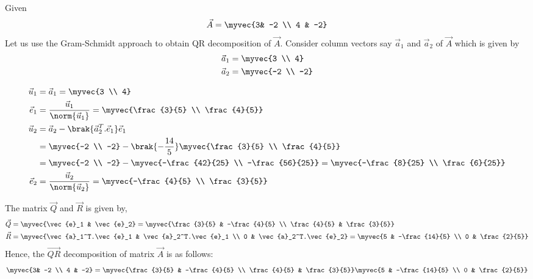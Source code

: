 
Given
\begin{align}
	\vec{A} =\myvec{3& -2 \\ 4 & -2}
\end{align}
Let us use the Gram-Schmidt approach to obtain QR decomposition of $\vec{A}$. Consider column vectors say $\vec{a}_1$ and $\vec{a}_2$ of $\vec{A}$ which is given by
\begin{align}
	\vec{a}_1 &=\myvec{3 \\ 4} \\
	\vec{a}_2 &=\myvec{-2 \\ -2}
\end{align}

\begin{align}
\vec{u}_1 &= \vec{a}_1 = \myvec{3 \\ 4} \\
\vec{e}_1 &= \frac{\vec{u}_1}{\norm{\vec{u}_1}} = \myvec{\frac{3}{5} \\ \frac{4}{5}}\\
\vec{u}_2 &= \vec{a}_2 - \brak{\vec{a}_2^T.\vec{e}_1}\vec{e}_1\\ 
&= \myvec{-2 \\ -2} - \brak{-\frac{14}{5}}\myvec{\frac{3}{5} \\ \frac{4}{5}}\\
&= \myvec{-2 \\ -2} - \myvec{-\frac{42}{25} \\ -\frac{56}{25}} = \myvec{-\frac{8}{25} \\ \frac{6}{25}}\\
\vec{e}_2 &= \frac{\vec{u}_2}{\norm{\vec{u}_2}}= \myvec{-\frac{4}{5} \\ \frac{3}{5}}
\end{align}

The matrix $\vec{Q}$ and $\vec{R}$ is given by,
\begin{align}
\vec{Q}&=\myvec{\vec{e}_1 & \vec{e}_2} = \myvec{\frac{3}{5} & -\frac{4}{5} \\ \frac{4}{5} & \frac{3}{5}}\\
\vec{R} &= \myvec{\vec{a}_1^T.\vec{e}_1 & \vec{a}_2^T.\vec{e}_1 \\
                  0                  & \vec{a}_2^T.\vec{e}_2}=\myvec{5 & -\frac{14}{5} \\ 0 & \frac{2}{5}}
\end{align}
Hence, the $\vec{QR}$ decomposition of matrix $\vec{A}$ is as follows:
\begin{align}
	\myvec{3& -2 \\ 4 & -2} = \myvec{\frac{3}{5} & -\frac{4}{5} \\ \frac{4}{5} & \frac{3}{5}}\myvec{5 & -\frac{14}{5} \\ 0 & \frac{2}{5}}
\end{align}
